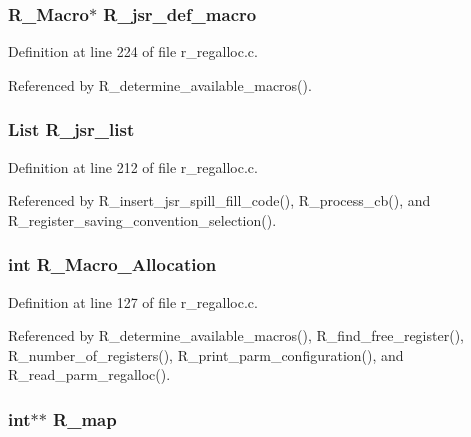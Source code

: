 \subsubsection{\setlength{\rightskip}{0pt plus 5cm}\bf{R\_\-Macro}$\ast$ \bf{R\_\-jsr\_\-def\_\-macro}}\label{r__regalloc_8h_58eacaad61f390154672f7aaaf697d74}




Definition at line 224 of file r\_\-regalloc.c.

Referenced by R\_\-determine\_\-available\_\-macros().
\subsubsection{\setlength{\rightskip}{0pt plus 5cm}\bf{List} \bf{R\_\-jsr\_\-list}}\label{r__regalloc_8h_e42142c3cf3f4b03b9c81ee578366b4a}




Definition at line 212 of file r\_\-regalloc.c.

Referenced by R\_\-insert\_\-jsr\_\-spill\_\-fill\_\-code(), R\_\-process\_\-cb(), and R\_\-register\_\-saving\_\-convention\_\-selection().
\subsubsection{\setlength{\rightskip}{0pt plus 5cm}int \bf{R\_\-Macro\_\-Allocation}}\label{r__regalloc_8h_57606c12fb7869c3f4b29009831e885f}




Definition at line 127 of file r\_\-regalloc.c.

Referenced by R\_\-determine\_\-available\_\-macros(), R\_\-find\_\-free\_\-register(), R\_\-number\_\-of\_\-registers(), R\_\-print\_\-parm\_\-configuration(), and R\_\-read\_\-parm\_\-regalloc().
\subsubsection{\setlength{\rightskip}{0pt plus 5cm}int$\ast$$\ast$ \bf{R\_\-map}}\label{r__regalloc_8h_618da4011243399ad7bd81e63f5b1577}




